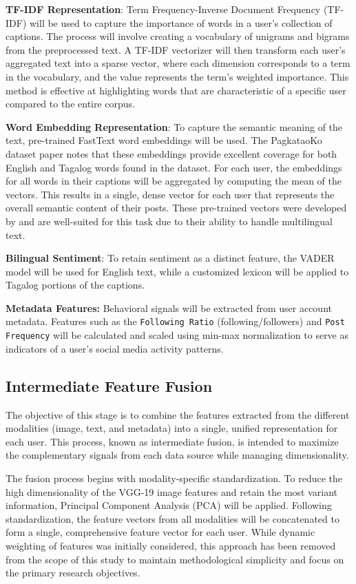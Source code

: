 \textbf{TF-IDF Representation}: Term Frequency-Inverse Document Frequency (TF-IDF) will be used to capture the importance of words in a user's collection of captions. The process will involve creating a vocabulary of unigrams and bigrams from the preprocessed text. A TF-IDF vectorizer will then transform each user's aggregated text into a sparse vector, where each dimension corresponds to a term in the vocabulary, and the value represents the term's weighted importance. This method is effective at highlighting words that are characteristic of a specific user compared to the entire corpus.

\textbf{Word Embedding Representation}: To capture the semantic meaning of the text, pre-trained FastText word embeddings will be used. The PagkataoKo dataset paper notes that these embeddings provide excellent coverage for both English and Tagalog words found in the dataset. For each user, the embeddings for all words in their captions will be aggregated by computing the mean of the vectors. This results in a single, dense vector for each user that represents the overall semantic content of their posts. These pre-trained vectors were developed by \citet{grave2018} and are well-suited for this task due to their ability to handle multilingual text.

\textbf{Bilingual Sentiment}: To retain sentiment as a distinct feature, the VADER model will be used for English text, while a customized lexicon will be applied to Tagalog portions of the captions.

\textbf{Metadata Features: }
Behavioral signals will be extracted from user account metadata. Features such as the \texttt{Following Ratio} (following/followers) and \texttt{Post Frequency} will be calculated and scaled using min-max normalization to serve as indicators of a user's social media activity patterns.
\subsection{Intermediate Feature Fusion}
\label{subsec:fusion}
The objective of this stage is to combine the features extracted from the different modalities (image, text, and metadata) into a single, unified representation for each user. This process, known as intermediate fusion, is intended to maximize the complementary signals from each data source while managing dimensionality.

The fusion process begins with modality-specific standardization. To reduce the high dimensionality of the VGG-19 image features and retain the most variant information, Principal Component Analysis (PCA) will be applied. Following standardization, the feature vectors from all modalities will be concatenated to form a single, comprehensive feature vector for each user. While dynamic weighting of features was initially considered, this approach has been removed from the scope of this study to maintain methodological simplicity and focus on the primary research objectives.

